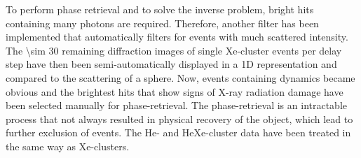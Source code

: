 To perform phase retrieval and to solve the inverse problem, bright hits containing many photons are required. Therefore, another filter has been implemented that automatically filters for events with much scattered intensity. The \num{\sim 30} remaining diffraction images of single Xe-cluster events per delay step have then been semi-automatically displayed in a 1D representation and compared to the scattering of a sphere. Now, events containing dynamics became obvious and the brightest hits that show signs of X-ray radiation damage have been selected manually for phase-retrieval. The phase-retrieval is an intractable process that not always resulted in physical recovery of the object, which lead to further exclusion of events. The He- and HeXe-cluster data have been treated in the same way as Xe-clusters.
%
%
%